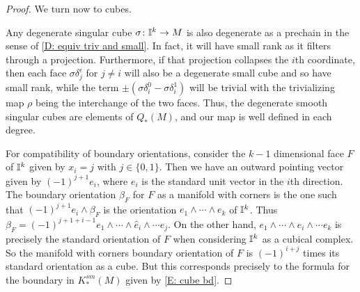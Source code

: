 \begin{proof}
	We turn now to cubes.

	Any degenerate singular cube $\sigma \colon \mathbb{I}^k \to M$ is also degenerate as a prechain in the sense of \cref{D: equiv triv and small}.
	In fact, it will have small rank as it filters through a projection.
	Furthermore, if that projection collapses the $i$th coordinate, then each face $\sigma \delta_j^\epsilon$ for $j\neq i$ will also be a degenerate small cube and so have small rank, while the term $\pm (\sigma \delta_i^0-\sigma \delta_i^1)$ will be trivial with the trivializing map $\rho$ being the interchange of the two faces.
	Thus, the degenerate smooth singular cubes are elements of $Q_*(M)$, and our map is well defined in each degree.

	For compatibility of boundary orientations, consider the $k-1$ dimensional face $F$ of $\mathbb{I}^k$ given by $x_i = j$ with $j\in\{0,1\}$.
	Then we have an outward pointing vector given by $(-1)^{j+1}e_i$, where $e_i$ is the standard unit vector in the $i$th direction.
	The boundary orientation $\beta_F$ for $F$ as a manifold with corners is the one such that
	$(-1)^{j+1}e_i \wedge \beta_F$ is the orientation $e_1 \wedge\cdots\wedge e_k$ of $\mathbb{I}^k$.
	Thus $\beta_F = (-1)^{j+1+i-1}e_1 \wedge \cdots \wedge \hat{e}_i \wedge \cdots e_j$.
	On the other hand, $e_1 \wedge \cdots \wedge \hat{e}_i \wedge \cdots e_k$ is precisely the standard orientation of $F$ when considering $\mathbb{I}^k$ as a cubical complex.
	So the manifold with corners boundary orientation of $F$ is $(-1)^{i+j}$ times its standard orientation as a cube.
	But this corresponds precisely to the formula for the boundary in $K^{sm}_*(M)$ given by \eqref{E: cube bd}.
\end{proof}

\begin{comment}
	As the cubes $\interval^k$ are compact manifolds with corners equipped with their standard orientations,
	we have $SK^{sm}_*(M) \into PC_*^\Gamma$.
	Furthermore, any degenerate singular cube $\sigma \colon \interval^k \to M$ is also degenerate in the sense of Definition \ref{D: equiv triv and small}.
	In fact, it will have small rank as it filters through a projection.
	Furthermore, if that projection collapses the $i$th coordinate then each face $\sigma \delta_j^\epsilon$ for $j\neq i$ will also be a degenerate small cube and so have small rank, while the term $\pm (\sigma \delta_i^0-\sigma \delta_i^1)$ will be trivial with the trivializing map $\rho$ being the interchange of the two faces.
	Thus, the degenerate smooth singular cubes are elements of $Q_*(M)$.
	As in the simplicial case one can check compatibility of boundary orientations so that we have a chain map $NK^{sm}_*(M) \to C_*^\Gamma(M)$.
	\red{NEED TO PROVE THIS IS A CHAIN MAP}
\end{comment}

